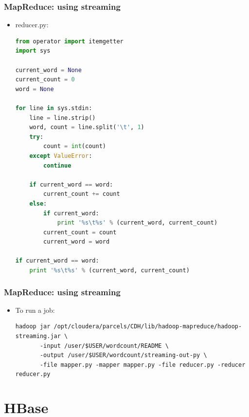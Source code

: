 \documentclass{beamer}
\begin{document}
\begin{frame}[fragile]
 \frametitle{MapReduce: using streaming}
\begin{itemize}
  \item {\color{mycolorcli}reducer.py}:
{\color{mycolorcode}
  \begin{lstlisting}[frame=single, basicstyle=\tiny,language=python]
from operator import itemgetter
import sys

current_word = None
current_count = 0
word = None

for line in sys.stdin: 
    line = line.strip()
    word, count = line.split('\t', 1)
    try:
        count = int(count)
    except ValueError:
        continue

    if current_word == word:
        current_count += count
    else:
        if current_word:
            print '%s\t%s' % (current_word, current_count)
        current_count = count
        current_word = word

if current_word == word:
    print '%s\t%s' % (current_word, current_count)
 \end{lstlisting}
}
\end{itemize}
\end{frame}

\begin{frame}[fragile]
 \frametitle{MapReduce: using streaming}

 \begin{itemize}
   \item To run a job:
{\color{mycolorcli}
  \begin{lstlisting}[frame=single, basicstyle=\tiny]
hadoop jar /opt/cloudera/parcels/CDH/lib/hadoop-mapreduce/hadoop-streaming.jar \ 
       -input /user/$USER/wordcount/README \
       -output /user/$USER/wordcount/streaming-out-py \ 
       -file mapper.py -mapper mapper.py -file reducer.py -reducer reducer.py
 \end{lstlisting}
}
 \end{itemize}


\end{frame}

\section{HBase}
\end{document}
